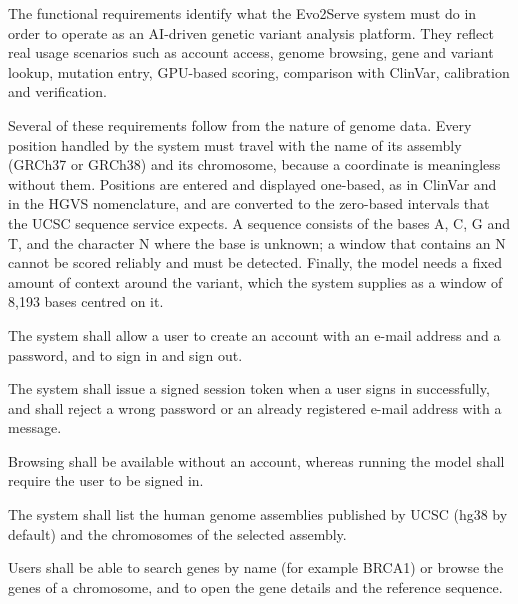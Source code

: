 \vspace{-8pt}
\vspace{2pt}
The functional requirements identify what the Evo2Serve system must do in order to operate as an AI-driven genetic variant analysis platform. They reflect real usage scenarios such as account access, genome browsing, gene and variant lookup, mutation entry, GPU-based scoring, comparison with ClinVar, calibration and verification.

Several of these requirements follow from the nature of genome data. Every position handled by the system must travel with the name of its assembly (GRCh37 or GRCh38) and its chromosome, because a coordinate is meaningless without them. Positions are entered and displayed one-based, as in ClinVar and in the HGVS nomenclature, and are converted to the zero-based intervals that the UCSC sequence service expects. A sequence consists of the bases A, C, G and T, and the character N where the base is unknown; a window that contains an N cannot be scored reliably and must be detected. Finally, the model needs a fixed amount of context around the variant, which the system supplies as a window of 8,193 bases centred on it.

\vspace{6pt}
\begin{subitemize}
\item The system shall allow a user to create an account with an e-mail address and a password, and to sign in and sign out.
\item The system shall issue a signed session token when a user signs in successfully, and shall reject a wrong password or an already registered e-mail address with a message.
\item Browsing shall be available without an account, whereas running the model shall require the user to be signed in.
\end{subitemize}

\vspace{4pt}
\begin{subitemize}
\item The system shall list the human genome assemblies published by UCSC (hg38 by default) and the chromosomes of the selected assembly.
\item Users shall be able to search genes by name (for example BRCA1) or browse the genes of a chromosome, and to open the gene details and the reference sequence.
\end{subitemize}

